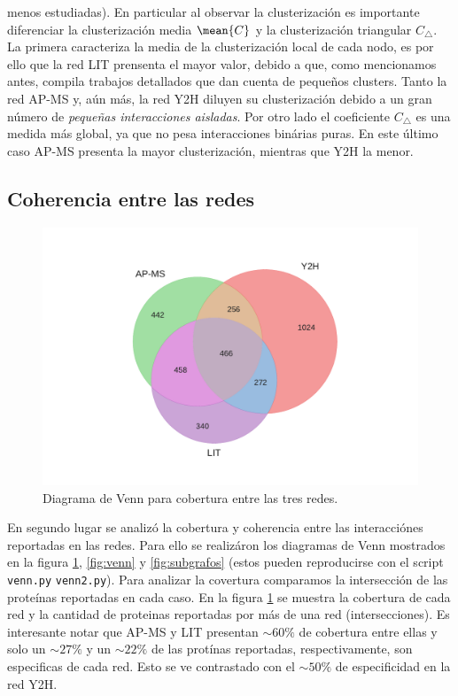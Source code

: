 menos estudiadas).
En particular al observar la clusterizaci\'on es importante diferenciar la clusterizaci\'on media $\mean{C}$ y la 
clusterizaci\'on triangular $C_\bigtriangleup$. La primera caracteriza la media de la clusterizaci\'on local de cada 
nodo, es por ello que la red LIT prensenta el mayor valor, debido a que, como mencionamos antes, compila
trabajos detallados que dan cuenta de peque\~nos clusters. Tanto la red AP-MS y, a\'un m\'as, la red Y2H diluyen
su clusterizaci\'on debido a un gran n\'umero de \textit{peque\~nas interacciones aisladas}. Por otro lado
el coeficiente $C_\bigtriangleup$ es una medida m\'as global, ya que no pesa interacciones bin\'arias puras.
En este \'ultimo caso AP-MS presenta la mayor clusterizaci\'on, mientras que Y2H la menor.


\subsection{Coherencia entre las redes}

\begin{figure}[!ht]
    \centering
    \includegraphics[width=.5\columnwidth]{./schemes/venn_AP-MS-Y2H-LIT_covertura.pdf}
    \caption{\label{fig:cober} Diagrama de Venn para cobertura entre las tres redes. }
\end{figure}



En segundo lugar se analiz\'o la cobertura y coherencia entre las interacci\'ones reportadas
en las redes. Para ello se realiz\'aron los diagramas de Venn mostrados en la figura \ref{fig:cober}, \ref{fig:venn} y \ref{fig:subgrafos}
(estos pueden reproducirse con el script \texttt{venn.py} \texttt{venn2.py}). Para analizar la covertura comparamos
la intersecci\'on de las prote\'inas reportadas en cada caso. En la figura \ref{fig:cober} se muestra
la cobertura de cada red y la cantidad de proteinas reportadas por m\'as de una red (intersecciones). Es 
interesante notar que AP-MS y LIT presentan $\sim 60\%$ de cobertura entre ellas y solo un $\sim 27\%$ 
y un $\sim 22\%$ de las prot\'inas reportadas, respectivamente, son especificas de cada red. Esto se ve contrastado
con el $\sim 50\%$ de especificidad en la red Y2H. 


